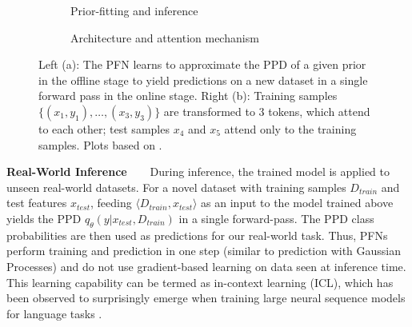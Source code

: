 \documentclass{article}
\newcommand{\slimparagraph}[1]{\textbf{#1~~~}}
\begin{document}
%
\begin{figure}[t]
     \centering
     \begin{subfigure}[t]{.49\textwidth}
         \centering
         
         \caption{Prior-fitting and inference}
         \label{fig:pfn_usage}
     \end{subfigure}
     \begin{subfigure}[t]{.49\textwidth}
         \centering
         
         \caption{Architecture and attention mechanism}
         \label{fig:transformer_visualization}
     \end{subfigure}
     \caption{Left (a): The PFN learns to approximate the PPD of a given prior in the offline stage to yield predictions on a new dataset in a single forward pass in the online stage. Right (b): Training samples $\{(x_1,y_1), \dots, (x_3,y_3)\}$ are transformed to $3$ tokens, which attend to each other; test samples $x_4$ and $x_5$ attend only to the training samples. Plots based on \cite{muller-iclr22a}.}
     \label{fig:pfn_overview}
\end{figure}
%
%

\slimparagraph{Real-World Inference} During inference, the trained model is applied to unseen real-world datasets. For a novel dataset with training samples $D_{train}$ and test features $x_{test}$, feeding $\langle{}D_{train},x_{test}\rangle$ as an input to the model trained above yields the PPD %
$q_{\theta}(y|x_{test},D_{train})$ in a single forward-pass. The PPD class probabilities are then used as predictions for our real-world task. Thus, PFNs perform training and prediction in one step (similar to prediction with Gaussian Processes) and do not use gradient-based learning on data seen at inference time.  This learning capability can be termed as in-context learning (ICL), which has been observed to surprisingly emerge when training large neural sequence models for language tasks \citep{NEURIPS2020_1457c0d6}.
\end{document}
